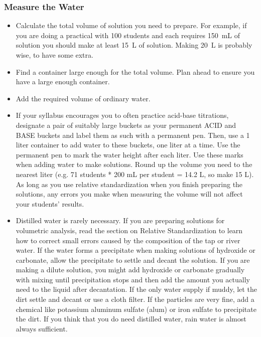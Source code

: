 \subsubsection{Measure the Water}

\begin{itemize}

\item{Calculate the total volume of solution you need to prepare. For example, if you are doing a practical with 100 students and each requires 150~mL of solution you should make at least 15~L of solution. Making 20~L is probably wise, to have some extra.}

\item{Find a container large enough for the total volume. Plan ahead to ensure you have a large enough container.}

\item{Add the required volume of ordinary water.}

\item{If your syllabus encourages you to often practice acid-base titrations, designate a pair of suitably large buckets as your permanent ACID and BASE buckets and label them as such with a permanent pen. Then, use a 1 liter container to add water to these buckets, one liter at a time. Use the permanent pen to mark the water height after each liter. Use these marks when adding water to make solutions. Round up the volume you need to the nearest liter (e.g. 71 students * 200 mL per student = 14.2 L, so make 15 L). As long as you use relative standardization when you finish preparing the solutions, any errors you make when measuring the volume will not affect your students' results.}

\item{Distilled water is rarely necessary. If you are preparing solutions for volumetric analysis, read the section on Relative Standardization to learn how to correct small errors caused by the composition of the tap or river water. If the water forms a precipitate when making solutions of hydroxide or carbonate, allow the precipitate to settle and decant the solution. If you are making a dilute solution, you might add hydroxide or carbonate gradually with mixing until precipitation stops and then add the amount you actually need to the liquid after decantation. If the only water supply if muddy, let the dirt settle and decant or use a cloth filter. If the particles are very fine, add a chemical like potassium aluminum sulfate (alum) or iron sulfate to precipitate the dirt. If you think that you do need distilled water, rain water is almost always sufficient.}
\end{itemize}

